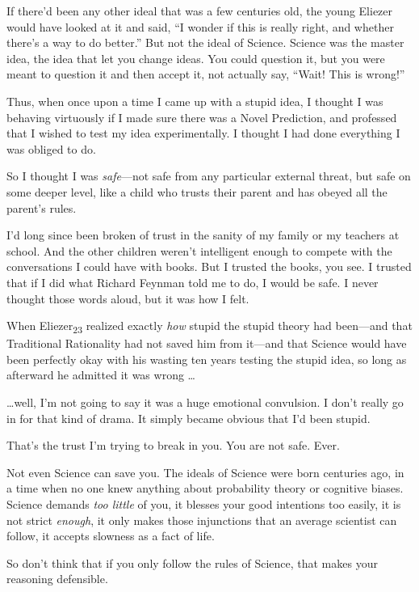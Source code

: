 {
 If there'd been any other ideal that was a few
centuries old, the young Eliezer would have looked at it and said,
``I wonder if this is really right, and whether
there's a way to do better.'' But not
the ideal of Science. Science was the master idea, the idea that let
you change ideas. You could question it, but you were meant to question
it and then accept it, not actually say, ``Wait! This
is wrong!''}

{
 Thus, when once upon a time I came up with a stupid idea, I
thought I was behaving virtuously if I made sure there was a Novel
Prediction, and professed that I wished to test my idea experimentally.
I thought I had done everything I was obliged to do.}

{
 So I thought I was \textit{safe}{}---not safe from any particular
external threat, but safe on some deeper level, like a child who trusts
their parent and has obeyed all the parent's rules.}

{
 I'd long since been broken of trust in the sanity
of my family or my teachers at school. And the other children
weren't intelligent enough to compete with the
conversations I could have with books. But I trusted the books, you
see. I trusted that if I did what Richard Feynman told me to do, I
would be safe. I never thought those words aloud, but it was how I
felt.}

{
 When Eliezer\textsubscript{23} realized exactly \textit{how}
stupid the stupid theory had been---and that Traditional Rationality
had not saved him from it---and that Science would have been perfectly
okay with his wasting ten years testing the stupid idea, so long as
afterward he admitted it was wrong \ldots}

{
 \ldots well, I'm not going to say it was a huge
emotional convulsion. I don't really go in for that
kind of drama. It simply became obvious that I'd been
stupid.}

{
 That's the trust I'm trying to
break in you. You are not safe. Ever.}

{
 Not even Science can save you. The ideals of Science were born
centuries ago, in a time when no one knew anything about probability
theory or cognitive biases. Science demands \textit{too little} of you,
it blesses your good intentions too easily, it is not strict
\textit{enough}, it only makes those injunctions that an average
scientist can follow, it accepts slowness as a fact of life.}

{
 So don't think that if you only follow the rules
of Science, that makes your reasoning defensible.}

